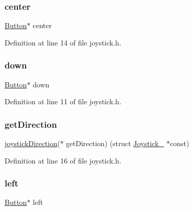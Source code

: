 \subsubsection{\texorpdfstring{center}{center}}
{\footnotesize\ttfamily \mbox{\hyperlink{button_8h_ab369ab7fa0b9a8dfec4fc1f653ac6de5}{Button}}$\ast$ center}



Definition at line 14 of file joystick.\+h.

\mbox{\label{struct_joystick___a9031d6ddde18c7b16c3242e403f3fbce}} 
\subsubsection{\texorpdfstring{down}{down}}
{\footnotesize\ttfamily \mbox{\hyperlink{button_8h_ab369ab7fa0b9a8dfec4fc1f653ac6de5}{Button}}$\ast$ down}



Definition at line 11 of file joystick.\+h.

\mbox{\label{struct_joystick___a95b0c18851cf4ff20aedac4196da5e17}} 
\subsubsection{\texorpdfstring{get\+Direction}{getDirection}}
{\footnotesize\ttfamily \mbox{\hyperlink{joystick_8h_ae3f9f641c46a8d3110940cc41d5a50c3}{joystick\+Direction}}($\ast$ get\+Direction) (struct \mbox{\hyperlink{struct_joystick__}{Joystick\+\_\+}} $\ast$const)}



Definition at line 16 of file joystick.\+h.

\mbox{\label{struct_joystick___a571327757de519da4471010fe0d1e2c5}} 
\subsubsection{\texorpdfstring{left}{left}}
{\footnotesize\ttfamily \mbox{\hyperlink{button_8h_ab369ab7fa0b9a8dfec4fc1f653ac6de5}{Button}}$\ast$ left}



